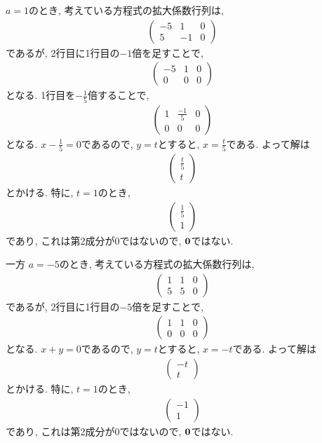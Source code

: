 \begin{checkanswer}%
  $a=1$のとき,
  考えている方程式の拡大係数行列は,
  \begin{align*}
    \begin{pmatrix}-5&1&0\\5&-1&0\end{pmatrix}
  \end{align*}
  であるが, 2行目に1行目の$-1$倍を足すことで,
  \begin{align*}
    \begin{pmatrix}-5&1&0\\0&0&0\end{pmatrix}
  \end{align*}
  となる. 1行目を$-\frac{1}{5}$倍することで,
  \begin{align*}
    \begin{pmatrix}1&\frac{-1}{5}&0\\0&0&0\end{pmatrix}
  \end{align*}
  となる.  $x-\frac{1}{5}=0$であるので, $y=t$とすると, $x=\frac{t}{5}$である.
  よって解は
  \begin{align*}
    \begin{pmatrix}\frac{t}{5}\\t\end{pmatrix}
  \end{align*}
  とかける. 特に, $t=1$のとき,
  \begin{align*}
    \begin{pmatrix}\frac{1}{5}\\1\end{pmatrix}
  \end{align*}
  であり, これは第2成分が$0$ではないので, $\boldsymbol{0}$ではない.

  一方
  $a=-5$のとき,
  考えている方程式の拡大係数行列は,
  \begin{align*}
    \begin{pmatrix}1&1&0\\5&5&0\end{pmatrix}
  \end{align*}
  であるが, 2行目に1行目の$-5$倍を足すことで,
  \begin{align*}
    \begin{pmatrix}1&1&0\\0&0&0\end{pmatrix}
  \end{align*}
  となる.
  $x+y=0$であるので, $y=t$とすると, $x=-t$である.
  よって解は
  \begin{align*}
    \begin{pmatrix}-t\\t\end{pmatrix}
  \end{align*}
  とかける. 特に, $t=1$のとき,
  \begin{align*}
    \begin{pmatrix}-1\\1\end{pmatrix}
  \end{align*}
  であり, これは第2成分が$0$ではないので, $\boldsymbol{0}$ではない.  
\end{checkanswer}



